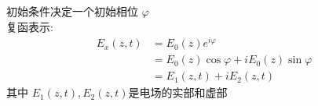 %
%

\begin{frame}
 \frametitle{}
 初始条件决定一个初始相位 $ \varphi$ \\ 
  {\Bullet}复函表示:  \[
    \begin{aligned}
         E_{x}(z, t) &=E_{0} (z) e^ {i\varphi}  \\
         &=  E_{0}(z) \cos\varphi  + i E_{0}(z) \sin\varphi \\ 
         &= E_1 (z,t) + i E_2 (z,t)
    \end{aligned}
    \]
  其中 $E_1(z,t), E_2(z,t) $是电场的实部和虚部 \\   
\end{frame}


